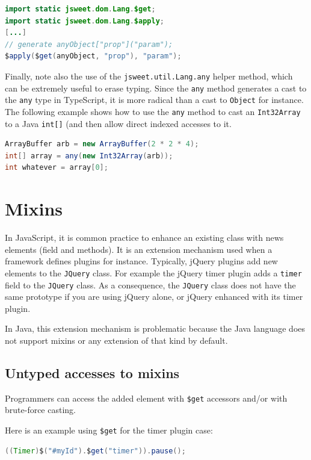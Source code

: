 \documentclass[a4paper]{report}
\begin{document}
\begin{lstlisting}[language=Java]
import static jsweet.dom.Lang.$get;
import static jsweet.dom.Lang.$apply;
[...]
// generate anyObject["prop"]("param"); 
$apply($get(anyObject, "prop"), "param"); 
\end{lstlisting}

Finally, note also the use of the \texttt{jsweet.util.Lang.any} helper method, which can be extremely useful to erase typing. Since the \texttt{any} method generates a cast to the \texttt{any} type in TypeScript, it is more radical than a cast to \texttt{Object} for instance. The following example shows how to use the \texttt{any} method to cast an \texttt{Int32Array} to a Java \texttt{int[]} (and then allow direct indexed accesses to it.

\begin{lstlisting}[language=Java]
ArrayBuffer arb = new ArrayBuffer(2 * 2 * 4);
int[] array = any(new Int32Array(arb));
int whatever = array[0];
\end{lstlisting}

\section{Mixins}

In JavaScript, it is common practice to enhance an existing class with news elements (field and methods). It is an extension mechanism used when a framework defines plugins for instance. Typically, jQuery plugins add new elements to the \texttt{JQuery} class. For example the jQuery timer plugin adds a \texttt{timer} field to the \texttt{JQuery} class. As a consequence, the \texttt{JQuery} class does not have the same prototype if you are using jQuery alone, or jQuery enhanced with its timer plugin.

In Java, this extension mechanism is problematic because the Java language does not support mixins or any extension of that kind by default. 

\subsection{Untyped accesses to mixins}

Programmers can access the added element with \texttt{\$get} accessors and/or with brute-force casting. 

Here is an example using \texttt{\$get} for the timer plugin case:

\begin{lstlisting}[language=Java]
((Timer)$("#myId").$get("timer")).pause();
\end{lstlisting}
\end{document}

